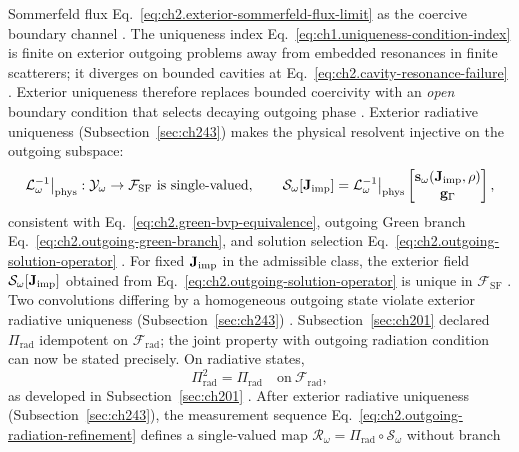 Sommerfeld flux Eq.~\eqref{eq:ch2.exterior-sommerfeld-flux-limit} as the coercive
boundary channel \cite{stratton1941}. The uniqueness index
Eq.~\eqref{eq:ch1.uniqueness-condition-index} is finite on exterior outgoing problems
away from embedded resonances in finite scatterers; it diverges on bounded cavities at
Eq.~\eqref{eq:ch2.cavity-resonance-failure} \cite{harrington2001}. Exterior uniqueness
therefore replaces bounded coercivity with an \emph{open} boundary condition that
selects decaying outgoing phase \cite{stratton1941}.
Exterior radiative uniqueness (Subsection~\ref{sec:ch243}) makes the physical resolvent
injective on the outgoing subspace:
\begin{equation}
\label{eq:ch2.exterior-resolvent-injective}
\mathcal{L}_\omega^{-1}\big|_{\mathrm{phys}}:
\mathcal{Y}_\omega\to\mathcal{F}_{\mathrm{SF}}
\ \text{is single-valued},
\qquad
\mathcal{S}_\omega[\mathbf{J}_{\mathrm{imp}}]
=
\mathcal{L}_\omega^{-1}\big|_{\mathrm{phys}}
\begin{bmatrix}\mathbf{s}_\omega(\mathbf{J}_{\mathrm{imp}},\rho)\\ \mathbf{g}_\Gamma\end{bmatrix},
\end{equation}
consistent with Eq.~\eqref{eq:ch2.green-bvp-equivalence}, outgoing Green branch
Eq.~\eqref{eq:ch2.outgoing-green-branch}, and solution selection
Eq.~\eqref{eq:ch2.outgoing-solution-operator} \cite{stratton1941}.
\label{cor:ch2.outgoing-green-unique}
For fixed \(\mathbf{J}_{\mathrm{imp}}\) in the admissible class, the exterior field
\(\mathcal{S}_\omega[\mathbf{J}_{\mathrm{imp}}]\) obtained from
Eq.~\eqref{eq:ch2.outgoing-solution-operator} is unique in
\(\mathcal{F}_{\mathrm{SF}}\) \cite{stratton1941}.
Two convolutions differing by a homogeneous outgoing state violate
exterior radiative uniqueness (Subsection~\ref{sec:ch243}) \cite{harrington2001}.
Subsection~\ref{sec:ch201} declared \(\Pi_{\mathrm{rad}}\) idempotent on
\(\mathcal{F}_{\mathrm{rad}}\); the joint property with outgoing radiation condition can now be
stated precisely. On radiative states,
\begin{equation}
\label{eq:ch2.rad-idempotency-radiative}
\Pi_{\mathrm{rad}}^2=\Pi_{\mathrm{rad}}
\quad\text{on}\ \mathcal{F}_{\mathrm{rad}},
\end{equation}
as developed in Subsection~\ref{sec:ch201} \cite{stratton1941}. After
exterior radiative uniqueness (Subsection~\ref{sec:ch243}), the measurement sequence
Eq.~\eqref{eq:ch2.outgoing-radiation-refinement} defines a single-valued map
\(\mathcal{R}_\omega=\Pi_{\mathrm{rad}}\circ\mathcal{S}_\omega\) without branch
